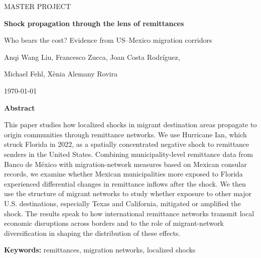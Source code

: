 \documentclass[12pt, a4paper]{report}
\newcommand{\thesisabstracten}{%
This paper studies how localized shocks in migrant destination areas propagate to origin communities through remittance networks. We use Hurricane Ian, which struck Florida in 2022, as a spatially concentrated negative shock to remittance senders in the United States. Combining municipality-level remittance data from Banco de México with migration-network measures based on Mexican consular records, we examine whether Mexican municipalities more exposed to Florida experienced differential changes in remittance inflows after the shock. We then use the structure of migrant networks to study whether exposure to other major U.S. destinations, especially Texas and California, mitigated or amplified the shock. The results speak to how international remittance networks transmit local economic disruptions across borders and to the role of migrant-network diversification in shaping the distribution of these effects.
}
\newcommand{\thesiskeywordsen}{remittances, migration networks, localized shocks}
\begin{document}
\hypersetup{pageanchor=false}



\clearpage

\thispagestyle{empty} 

\begin{center}
    {\large MASTER PROJECT\par}
    \vspace{0.5cm}

    {\Large \bfseries Shock propagation through the lens of remittances\par}
    {\large Who bears the cost? Evidence from US--Mexico migration corridors\par}
    \vspace{0.5cm}

    {
    \setlength{\parskip}{2pt}
    \normalsize
    Anqi Wang Liu,
    Francesco Zucca,
    Joan Costa Rodríguez, \par
    Michael Fehl,
    Xènia Alemany Rovira
    }

    \vspace{0.2cm}
    \today

    \vspace{0.5cm}
    {\large \bfseries Abstract\par}
\end{center}

\thesisabstracten

\vspace{0.35cm}
\noindent\textbf{Keywords:} \thesiskeywordsen

\clearpage

\pagestyle{empty} 
\tableofcontents
\clearpage

\hypersetup{pageanchor=true}
\pagestyle{fancy}     













\newpage
\begingroup
\renewcommand*{\bibfont}{\fontsize{10pt}{12pt}\selectfont} 
\setlength{\bibitemsep}{2pt}
\printbibliography[heading=bibintoc, title={References}]
\endgroup
\end{document}
